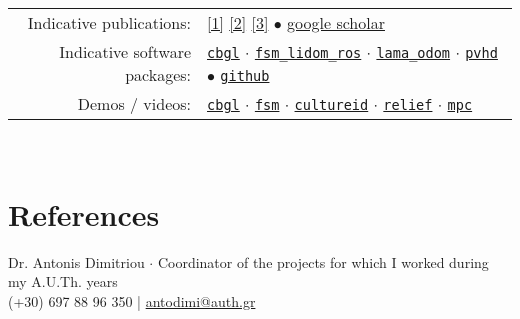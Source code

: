 \documentclass[a4paper,10pt,twoside]{article}
\begin{document}
\begin{tabular}{rp{12cm}}
  Indicative publications: &
\href{https://ieeexplore.ieee.org/abstract/document/9981228}{[1]}
\href{https://www.sciencedirect.com/science/article/abs/pii/S0921889021002323}{[2]}
\href{https://www.tandfonline.com/doi/full/10.1080/00207179.2018.1514129}{[3]} $\bullet$ \href{https://scholar.google.com/citations?view\_op=list\_works\&hl=en\&user=9\_hI4hMAAAAJ}{google scholar}\\

  Indicative software packages: &
\href{https://github.com/li9i/cbgl}{\texttt{cbgl}} $\cdot$
\href{https://github.com/li9i/fsm\_lidom\_ros}{\texttt{fsm\_lidom\_ros}} $\cdot$
\href{https://github.com/li9i/lama\_odom}{\texttt{lama\_odom}} $\cdot$
\href{https://github.com/li9i/pandora\_vision\_2014/tree/hydro-devel/pandora\_vision\_hole\_detector}{\texttt{pvhd}} $\bullet$ \href{https://github.com/li9i}{\texttt{github}}\\

  Demos / videos: & \href{https://www.youtube.com/watch?v=xaDKjI0WkDc}{\texttt{cbgl}} $\cdot$ \href{https://www.youtube.com/watch?v=hB4qsHCEXGI}{\texttt{fsm}} $\cdot$ \href{https://cultureid.web.auth.gr/?page\_id=200&lang=en}{\texttt{cultureid}} $\cdot$ \href{https://relief.web.auth.gr/}{\texttt{relief}} $\cdot$ \href{https://www.youtube.com/watch?v=937OZez1iN8}{\texttt{mpc}}
\end{tabular}
\\

\section{References}
Dr. Antonis Dimitriou $\cdot$ Coordinator of the projects for which I worked during my A.U.Th. years \\
  (+30) 697 88 96 350 | \href{mailto:antodimi@auth.gr}{antodimi@auth.gr} \\



\end{document}
